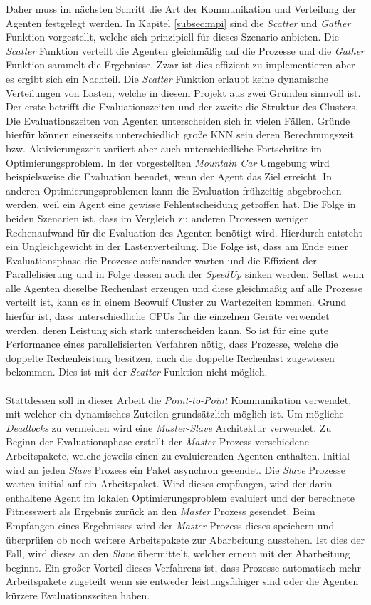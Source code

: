 Daher muss im nächsten Schritt die Art der Kommunikation und Verteilung der Agenten festgelegt werden. In Kapitel \ref{subsec:mpi} sind die \emph{Scatter} und \emph{Gather} Funktion vorgestellt, welche sich prinzipiell für dieses Szenario anbieten. Die \emph{Scatter} Funktion verteilt die Agenten gleichmäßig auf die Prozesse und die \emph{Gather} Funktion sammelt die Ergebnisse. Zwar ist dies effizient zu implementieren aber es ergibt sich ein Nachteil. Die \emph{Scatter} Funktion erlaubt keine dynamische Verteilungen von Lasten, welche in diesem Projekt aus zwei Gründen sinnvoll ist. Der erste betrifft die Evaluationszeiten und der zweite die Struktur des Clusters. Die Evaluationszeiten von Agenten unterscheiden sich in vielen Fällen. Gründe hierfür können einerseits unterschiedlich große \ac{KNN} sein deren Berechnungszeit bzw. Aktivierungszeit variiert aber auch unterschiedliche Fortschritte im Optimierungsproblem. In der vorgestellten \emph{Mountain Car} Umgebung wird beispielsweise die Evaluation beendet, wenn der Agent das Ziel erreicht. In anderen Optimierungsproblemen kann die Evaluation frühzeitig abgebrochen werden, weil ein Agent eine gewisse Fehlentscheidung getroffen hat. Die Folge in beiden Szenarien ist, dass im Vergleich zu anderen Prozessen weniger Rechenaufwand für die Evaluation des Agenten benötigt wird. Hierdurch entsteht ein Ungleichgewicht in der Lastenverteilung. Die Folge ist, dass am Ende einer Evaluationsphase die Prozesse aufeinander warten und die Effizient der Parallelisierung und in Folge dessen auch der \emph{SpeedUp} sinken werden. Selbst wenn alle Agenten dieselbe Rechenlast erzeugen und diese gleichmäßig auf alle Prozesse verteilt ist, kann es in einem Beowulf Cluster zu Wartezeiten kommen. Grund hierfür ist, dass unterschiedliche \acp{CPU} für die einzelnen Geräte verwendet werden, deren Leistung sich stark unterscheiden kann. So ist für eine gute Performance eines parallelisierten Verfahren nötig, dass Prozesse, welche die doppelte Rechenleistung besitzen, auch die doppelte Rechenlast zugewiesen bekommen. Dies ist mit der \emph{Scatter} Funktion nicht möglich.
\\\\
Stattdessen soll in dieser Arbeit die \emph{Point-to-Point} Kommunikation verwendet, mit welcher ein dynamisches Zuteilen grundsätzlich möglich ist. Um mögliche \emph{Deadlocks} zu vermeiden wird eine \emph{Master-Slave} Architektur verwendet. Zu Beginn der Evaluationsphase erstellt der \emph{Master} Prozess verschiedene Arbeitspakete, welche jeweils einen zu evaluierenden Agenten enthalten. Initial wird an jeden \emph{Slave} Prozess ein Paket asynchron gesendet. Die \emph{Slave} Prozesse warten initial auf ein Arbeitspaket. Wird dieses empfangen, wird der darin enthaltene Agent im lokalen Optimierungsproblem evaluiert und der berechnete Fitnesswert als Ergebnis zurück an den \emph{Master} Prozess gesendet. Beim Empfangen eines Ergebnisses wird der \emph{Master} Prozess dieses speichern und überprüfen ob noch weitere Arbeitspakete zur Abarbeitung ausstehen. Ist dies der Fall, wird dieses an den \emph{Slave} übermittelt, welcher erneut mit der Abarbeitung beginnt. Ein großer Vorteil dieses Verfahrens ist, dass Prozesse automatisch mehr Arbeitspakete zugeteilt wenn sie entweder leistungsfähiger sind oder die Agenten kürzere Evaluationszeiten haben.
